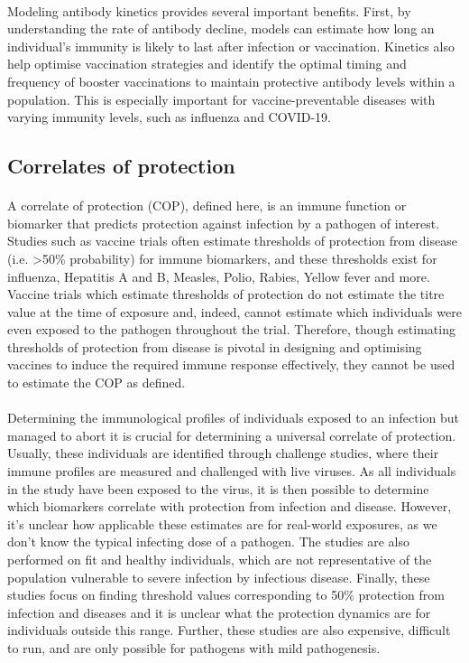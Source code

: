 \paragraph{}Modeling antibody kinetics provides several important benefits. First, by understanding the rate of antibody decline, models can estimate how long an individual's immunity is likely to last after infection or vaccination. Kinetics also help optimise vaccination strategies and identify the optimal timing and frequency of booster vaccinations to maintain protective antibody levels within a population. This is especially important for vaccine-preventable diseases with varying immunity levels, such as influenza and COVID-19.

\subsection{Correlates of protection}
\paragraph{} A correlate of protection (COP), defined here, is an immune function or biomarker that predicts protection against infection by a pathogen of interest. Studies such as vaccine trials often estimate thresholds of protection from disease (i.e. >50\% probability) for immune biomarkers, and these thresholds exist for influenza, Hepatitis A and B, Measles, Polio, Rabies, Yellow fever and more.\cite{Plotkin2022-pg} Vaccine trials which estimate thresholds of protection do not estimate the titre value at the time of exposure and, indeed, cannot estimate which individuals were even exposed to the pathogen throughout the trial. Therefore, though estimating thresholds of protection from disease is pivotal in designing and optimising vaccines to induce the required immune response effectively, they cannot be used to estimate the COP as defined. \cite{Immunology_undated-fs}

\paragraph{}Determining the immunological profiles of individuals exposed to an infection but managed to abort it is crucial for determining a universal correlate of protection. Usually, these individuals are identified through challenge studies, where their immune profiles are measured and challenged with live viruses.\cite{Deming2020-rz} As all individuals in the study have been exposed to the virus, it is then possible to determine which biomarkers correlate with protection from infection and disease. However, it's unclear how applicable these estimates are for real-world exposures, as we don’t know the typical infecting dose of a pathogen. The studies are also performed on fit and healthy individuals, which are not representative of the population vulnerable to severe infection by infectious disease. Finally, these studies focus on finding threshold values corresponding to 50\% protection from infection and diseases and it is unclear what the protection dynamics are for individuals outside this range. Further, these studies are also expensive, difficult to run, and are only possible for pathogens with mild pathogenesis.\cite{Sekhar2020-ux} 

